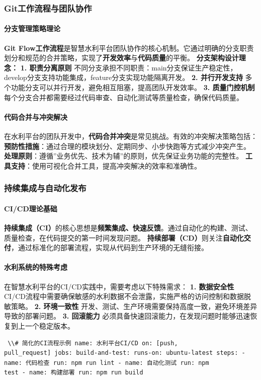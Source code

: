 \subsubsection{Git工作流程与团队协作}\label{gitux5de5ux4f5cux6d41ux7a0bux4e0eux56e2ux961fux534fux4f5c}
\paragraph{分支管理策略理论}\label{ux5206ux652fux7ba1ux7406ux7b56ux7565ux7406ux8bba} \textbf{Git
Flow工作流程}是智慧水利平台团队协作的核心机制。它通过明确的分支职责划分和规范的合并策略，实现了\textbf{开发效率}与\textbf{代码质量}的平衡。 \textbf{分支架构设计理念：} \textbf{1. 职责分离原则}
不同分支承担不同职责：main分支保证生产稳定性，develop分支支持功能集成，feature分支实现功能隔离开发。 \textbf{2. 并行开发支持} 多个功能分支可以并行开发，避免相互阻塞，提高团队开发效率。 \textbf{3.
质量门控机制} 每个分支合并都需要经过代码审查、自动化测试等质量检查，确保代码质量。
\paragraph{代码合并与冲突解决}\label{ux4ee3ux7801ux5408ux5e76ux4e0eux51b2ux7a81ux89e3ux51b3}
在水利平台的团队开发中，\textbf{代码合并冲突}是常见挑战。有效的冲突解决策略包括： \textbf{预防性措施}：通过合理的模块划分、定期同步、小步快跑等方式减少冲突产生。
\textbf{处理原则}：遵循''业务优先、技术为辅''的原则，优先保证业务功能的完整性。 \textbf{工具支持}：使用可视化合并工具，提高冲突解决的效率和准确性。
\subsubsection{持续集成与自动化发布}\label{ux6301ux7eedux96c6ux6210ux4e0eux81eaux52a8ux5316ux53d1ux5e03}
\paragraph{CI/CD理论基础}\label{cicdux7406ux8bbaux57faux7840}
\textbf{持续集成（CI）}的核心思想是\textbf{频繁集成、快速反馈}。通过自动化的构建、测试、质量检查，在代码提交的第一时间发现问题。
\textbf{持续部署（CD）}则关注\textbf{自动化交付}，通过标准化的部署流程，实现从代码到生产环境的无缝衔接。
\paragraph{水利系统的特殊考虑}\label{ux6c34ux5229ux7cfbux7edfux7684ux7279ux6b8aux8003ux8651} 在智慧水利平台的CI/CD实践中，需要考虑以下特殊需求：
\textbf{1. 数据安全性} CI/CD流程中需要确保敏感的水利数据不会泄露，实施严格的访问控制和数据脱敏策略。 \textbf{2. 环境一致性} 开发、测试、生产环境需要保持高度一致，避免环境差异导致的部署问题。
\textbf{3. 回滚能力} 必须具备快速回滚能力，在发现问题时能够迅速恢复到上一个稳定版本。 \begin{lstlisting} \\# 简化的CI流程示例 name: 水利平台CI/CD on: [push,
pull_request] jobs: build-and-test: runs-on: ubuntu-latest steps: - name: 代码检查 run: npm run lint - name: 自动化测试 run: npm
test - name: 构建部署 run: npm run build \end{lstlisting}
